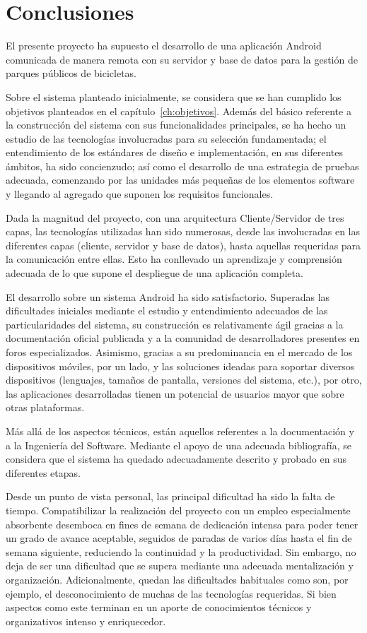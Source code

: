 \chapter{Conclusiones}

El presente proyecto ha supuesto el desarrollo de una aplicación Android comunicada de manera remota con su servidor y base de datos para la gestión de parques públicos de bicicletas.

Sobre el sistema planteado inicialmente, se considera que se han cumplido los objetivos planteados en el capítulo~\ref{ch:objetivos}. Además del básico referente a la construcción del sistema con sus funcionalidades principales, se ha hecho un estudio de las tecnologías involucradas para su selección fundamentada; el entendimiento de los estándares de diseño e implementación, en sus diferentes ámbitos, ha sido concienzudo; así como el desarrollo de una estrategia de pruebas adecuada, comenzando por las unidades más pequeñas de los elementos software y llegando al agregado que suponen los requisitos funcionales.

Dada la magnitud del proyecto, con una arquitectura Cliente/Servidor de tres capas, las tecnologías utilizadas han sido numerosas, desde las involucradas en las diferentes capas (cliente, servidor y base de datos), hasta aquellas requeridas para la comunicación entre ellas. Esto ha conllevado un aprendizaje y comprensión adecuada de lo que supone el despliegue de una aplicación completa.

El desarrollo sobre un sistema Android ha sido satisfactorio. Superadas las dificultades iniciales mediante el estudio y entendimiento adecuados de las particularidades del sistema, su construcción es relativamente ágil gracias a la documentación oficial publicada y a la comunidad de desarrolladores presentes en foros especializados. Asimismo, gracias a su predominancia en el mercado de los dispositivos móviles, por un lado, y las soluciones ideadas para soportar diversos dispositivos (lenguajes, tamaños de pantalla, versiones del sistema, etc.), por otro, las aplicaciones desarrolladas tienen un potencial de usuarios mayor que sobre otras plataformas.

Más allá de los aspectos técnicos, están aquellos referentes a la documentación y a la Ingeniería del Software. Mediante el apoyo de una adecuada bibliografía, se considera que el sistema ha quedado adecuadamente descrito y probado en sus diferentes etapas.

Desde un punto de vista personal, las principal dificultad ha sido la falta de tiempo. Compatibilizar la realización del proyecto con un empleo especialmente absorbente desemboca en fines de semana de dedicación intensa para poder tener un grado de avance aceptable, seguidos de paradas de varios días hasta el fin de semana siguiente, reduciendo la continuidad y la productividad. Sin embargo, no deja de ser una dificultad que se supera mediante una adecuada mentalización y organización. Adicionalmente, quedan las dificultades habituales como son, por ejemplo, el desconocimiento de muchas de las tecnologías requeridas. Si bien aspectos como este terminan en un aporte de conocimientos técnicos y organizativos intenso y enriquecedor.

